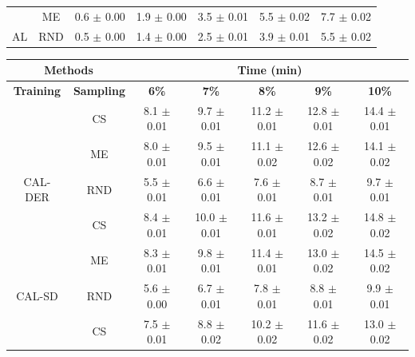 \begin{table}[htbp]
\begin{tabular*}{\linewidth}{c|c|@{\extracolsep{\fill}}ccccc}
 & ME & 0.6 $\pm$ {\small 0.00} & 1.9 $\pm$ {\small 0.00} & 3.5 $\pm$ {\small 0.01} & 5.5 $\pm$ {\small 0.02} & 7.7 $\pm$ {\small 0.02}\\

\multirow{-3}{*}{\raggedright\arraybackslash AL} & RND & 0.5 $\pm$ {\small 0.00} & 1.4 $\pm$ {\small 0.00} & 2.5 $\pm$ {\small 0.01} & 3.9 $\pm$ {\small 0.01} & 5.5 $\pm$ {\small 0.02}\\
\bottomrule
\end{tabular*}
\vspace{0.5em}

\begin{tabular*}{\linewidth}{c|c|@{\extracolsep{\fill}}ccccc}
\toprule
\multicolumn{2}{c|}{\textbf{Methods}} & \multicolumn{5}{c}{\textbf{Time (min)}} \\
\midrule
\textbf{Training} & \textbf{Sampling} & \textbf{6\%} & \textbf{7\%} & \textbf{8\%} & \textbf{9\%} & \textbf{10\%}\\
\midrule
 & CS & 8.1 $\pm$ {\small 0.01} & 9.7 $\pm$ {\small 0.01} & 11.2 $\pm$ {\small 0.01} & 12.8 $\pm$ {\small 0.01} & 14.4 $\pm$ {\small 0.01}\\

 & ME & 8.0 $\pm$ {\small 0.01} & 9.5 $\pm$ {\small 0.01} & 11.1 $\pm$ {\small 0.02} & 12.6 $\pm$ {\small 0.02} & 14.1 $\pm$ {\small 0.02}\\

\multirow{-3}{*}{\raggedright\arraybackslash CAL-DER} & RND & 5.5 $\pm$ {\small 0.01} & 6.6 $\pm$ {\small 0.01} & 7.6 $\pm$ {\small 0.01} & 8.7 $\pm$ {\small 0.01} & 9.7 $\pm$ {\small 0.01}\\
\midrule
 & CS & 8.4 $\pm$ {\small 0.01} & 10.0 $\pm$ {\small 0.01} & 11.6 $\pm$ {\small 0.01} & 13.2 $\pm$ {\small 0.02} & 14.8 $\pm$ {\small 0.02}\\

 & ME & 8.3 $\pm$ {\small 0.01} & 9.8 $\pm$ {\small 0.01} & 11.4 $\pm$ {\small 0.01} & 13.0 $\pm$ {\small 0.02} & 14.5 $\pm$ {\small 0.02}\\

\multirow{-3}{*}{\raggedright\arraybackslash CAL-SD} & RND & 5.6 $\pm$ {\small 0.00} & 6.7 $\pm$ {\small 0.01} & 7.8 $\pm$ {\small 0.01} & 8.8 $\pm$ {\small 0.01} & 9.9 $\pm$ {\small 0.01}\\
\midrule
 & CS & 7.5 $\pm$ {\small 0.01} & 8.8 $\pm$ {\small 0.02} & 10.2 $\pm$ {\small 0.02} & 11.6 $\pm$ {\small 0.02} & 13.0 $\pm$ {\small 0.02}\\


\end{tabular*}
\end{table}
